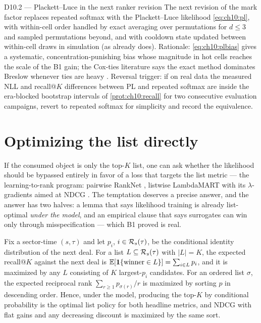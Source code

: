 \begin{decision}{D10.2 --- Plackett--Luce in the next ranker revision}
The next revision of the mark factor replaces repeated softmax with the
Plackett--Luce likelihood \cref{eq:ch10:pl}, with within-cell order
handled by exact averaging over permutations for $d \le 3$ and sampled
permutations beyond, and with cooldown state updated between within-cell
draws in simulation (as  already does).
Rationale: \cref{eq:ch10:plbias} gives a systematic, concentration-punishing
bias whose magnitude in hot cells reaches the scale of the B1 gain; the
Cox-ties literature says the exact method dominates Breslow whenever ties
are heavy \citep{therneau2000}. Reversal trigger: if on real data the
measured NLL and recall@$K$ differences between PL and repeated softmax
are inside the era-blocked bootstrap intervals of
\cref{prot:ch10:recall} for two consecutive evaluation campaigns, revert
to repeated softmax for simplicity and record the equivalence.
\end{decision}

\section{Optimizing the list directly}\label{ch10:sec:direct}

If the consumed object is only the top-$K$ list, one can ask whether the
likelihood should be bypassed entirely in favor of a loss that targets
the list metric --- the learning-to-rank program: pairwise RankNet
\citep{burges2005}, listwise LambdaMART with its $\lambda$-gradients
aimed at NDCG \citep{burges2010,jarvelin2002}. The temptation deserves a
precise answer, and the answer has two halves: a lemma that says
likelihood training is already list-optimal \emph{under the model}, and
an empirical clause that says surrogates can win only through
misspecification --- which B1 proved is real.

\begin{lemma}\label{lem:ch10:topk}
Fix a sector-time $(s, \tau)$ and let $p_i$, $i \in \mathcal{R}_s(\tau)$, be
the conditional identity distribution of the next deal. For a list $L
\subseteq \mathcal{R}_s(\tau)$ with $|L| = K$, the expected recall@$K$
against the next deal is $\mathbb{E}[\mathbf{1}\{\text{winner} \in L\}] = \sum_{i \in L}
p_i$, and it is maximized by any $L$ consisting of $K$ largest-$p_i$
candidates. For an ordered list $\sigma$, the expected reciprocal rank
$\sum_{r \ge 1} p_{\sigma(r)} / r$ is maximized by sorting $p$ in
descending order. Hence, under the model, producing the top-$K$ by
conditional probability is the optimal list policy for both headline
metrics, and NDCG with flat gains and any decreasing discount is
maximized by the same sort.
\end{lemma}

